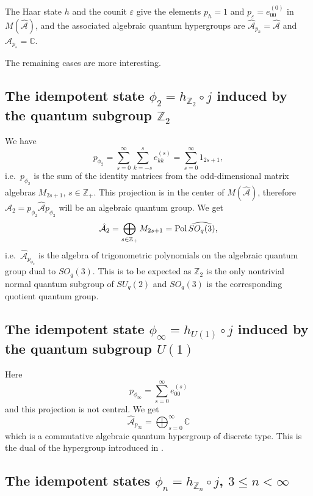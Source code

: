 \documentclass[12pt]{amsart}
\theoremstyle{definition}
\theoremstyle{remark}
\numberwithin{equation}{section}
\begin{document}
The Haar state $h$ and the counit $\varepsilon$ give the elements $p_h=1$ and
$p_\varepsilon=e^{(0)}_{00}$ in $M(\hat{\mathcal{A}})$, and the associated
algebraic quantum hypergroups are $\hat{\mathcal{A}}_{p_h}=\hat{\mathcal{A}}$ and $\hat{\mathcal{A}}_{p_\varepsilon}=\mathbb{C}$.

The remaining cases are more interesting.

\subsection{The idempotent state $\phi_2 = h_{\mathbb{Z}_2}\circ j$ induced
  by the quantum  subgroup $\mathbb{Z}_2$}

We have
\[
p_{\phi_2} = \sum_{s=0}^\infty \sum_{k=-s}^s e^{(s)}_{kk} = \sum_{s=0}^\infty
1_{2s+1},
\]
i.e.\ $p_{\phi_2}$ is the sum of the identity matrices from the
odd-dimensional matrix algebras $M_{2s+1}$, $s\in\mathbb{Z}_+$. This
projection is in the center of $M(\hat{\mathcal{A}})$, therefore $\hat{\mathcal{A}}_2=p_{\phi_2}\hat{\mathcal{A}}p_{\phi_2}$
will be an algebraic quantum group. We get
\[
\hat{\mathcal{A}}_2= \bigoplus_{s\in \mathbb{Z}_+} M_{2s+1} = {\rm Pol}\,
\widehat{SO_q(3)},
\]
i.e.\ $\hat{\mathcal{A}}_{p_{\phi_2}}$ is the algebra of trigonometric polynomials on the algebraic quantum group dual to $SO_q(3)$. This is to be expected as
$\mathbb{Z}_2$ is the only nontrivial normal quantum subgroup of $SU_q(2)$ and $SO_q(3)$ is the corresponding quotient quantum group.

\subsection{The idempotent state $\phi_\infty = h_{U(1)}\circ j$ induced by the quantum subgroup  $U(1)$}

Here
\[
p_{\phi_{\infty}}= \sum_{s=0}^\infty e^{(s)}_{00}
\]
and this projection is not central. We get
\[
\hat{\mathcal{A}}_{p_\infty} = \bigoplus_{s=0}^\infty \mathbb{C}
\]
which is a commutative algebraic quantum hypergroup of discrete type. This is the dual of the hypergroup introduced in \cite[Section 7]{koornwinder91}.

\subsection{The idempotent states $\phi_n = h_{\mathbb{Z}_{n}}\circ j$, $3\le n<\infty$}
\end{document}
